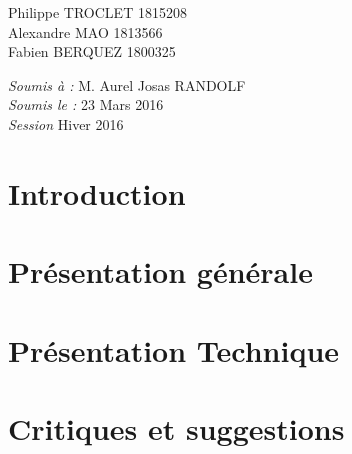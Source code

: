 \documentclass[12pt, a4paper]{article}%
\begin{document}
\begin{titlepage}
\begin{sffamily}
\begin{center}
    \begin{minipage}{0.4\textwidth}
      \begin{flushleft} \large
          Philippe TROCLET \textsc{1815208}\\
          Alexandre  MAO \textsc{1813566}\\
          Fabien  BERQUEZ \textsc{1800325}\\
      \end{flushleft}
    \end{minipage}
    \begin{minipage}{0.4\textwidth}
      \begin{flushright} \large
        \emph{Soumis à :} M. Aurel Josas RANDOLF\\
        \emph{Soumis le :} 23 Mars 2016  \\
        \emph{Session} Hiver 2016 
      \end{flushright}
    \end{minipage}

    \vfill

  \end{center}
  \end{sffamily}
\end{titlepage}%


\section{Introduction}
\section{Présentation générale}
\section{Présentation Technique}
\section{Critiques et suggestions}
\end{document}
